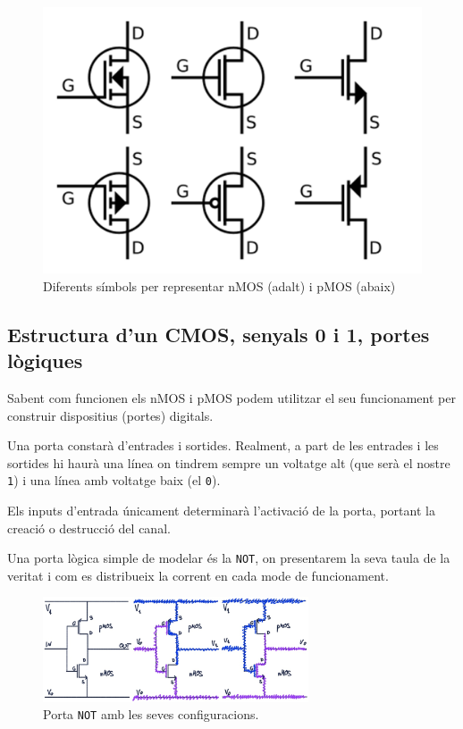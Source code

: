 \documentclass[11pt,a4paper]{article}
\begin{document}
\begin{figure}
    \centering
    \includegraphics[width=\linewidth]{images/npmos symbols.png}
    \caption{Diferents símbols per representar nMOS (adalt) i pMOS (abaix)}
    \vspace{-2cm}
\end{figure}

\subsection{Estructura d'un CMOS, senyals 0 i 1, portes lògiques}

Sabent com funcionen els nMOS i pMOS podem utilitzar el seu funcionament per construir dispositius (portes) digitals.

Una porta constarà d'entrades i sortides. Realment, a part de les entrades i les sortides hi haurà una línea on tindrem sempre un voltatge alt (que serà el nostre \texttt{1}) i una línea amb voltatge baix (el \texttt{0}).

Els inputs d'entrada únicament determinarà l'activació de la porta, portant la creació o destrucció del canal.

Una porta lògica simple de modelar és la \texttt{NOT}, on presentarem la seva taula de la veritat i com es distribueix la corrent en cada mode de funcionament.

\begin{figure}[h]
    \centering
    \includegraphics[width=0.7\textwidth]{images/notgate actions.png}
    \caption{Porta \texttt{NOT} amb les seves configuracions.}
    \label{fig:not-gate}
\end{figure}
\end{document}
